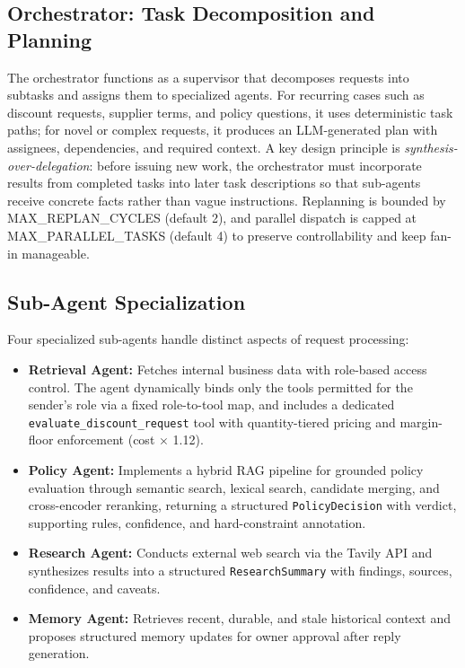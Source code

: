 \documentclass[11pt]{article}
\begin{document}
\subsection{Orchestrator: Task Decomposition and Planning}

The orchestrator functions as a supervisor that decomposes requests into subtasks and assigns them to specialized agents. For recurring cases such as discount requests, supplier terms, and policy questions, it uses deterministic task paths; for novel or complex requests, it produces an LLM-generated plan with assignees, dependencies, and required context. A key design principle is \textit{synthesis-over-delegation}: before issuing new work, the orchestrator must incorporate results from completed tasks into later task descriptions so that sub-agents receive concrete facts rather than vague instructions. Replanning is bounded by MAX\_REPLAN\_CYCLES (default 2), and parallel dispatch is capped at MAX\_PARALLEL\_TASKS (default 4) to preserve controllability and keep fan-in manageable.


\subsection{Sub-Agent Specialization}

Four specialized sub-agents handle distinct aspects of request processing:

\begin{itemize}
\item \textbf{Retrieval Agent:} Fetches internal business data with role-based access control. The agent dynamically binds only the tools permitted for the sender's role via a fixed role-to-tool map, and includes a dedicated \texttt{evaluate\_discount\_request} tool with quantity-tiered pricing and margin-floor enforcement (cost $\times$ 1.12).

\item \textbf{Policy Agent:} Implements a hybrid RAG pipeline for grounded policy evaluation through semantic search, lexical search, candidate merging, and cross-encoder reranking, returning a structured \texttt{PolicyDecision} with verdict, supporting rules, confidence, and hard-constraint annotation.

\item \textbf{Research Agent:} Conducts external web search via the Tavily API and synthesizes results into a structured \texttt{ResearchSummary} with findings, sources, confidence, and caveats.

\item \textbf{Memory Agent:} Retrieves recent, durable, and stale historical context and proposes structured memory updates for owner approval after reply generation.
\end{itemize}
\end{document}
